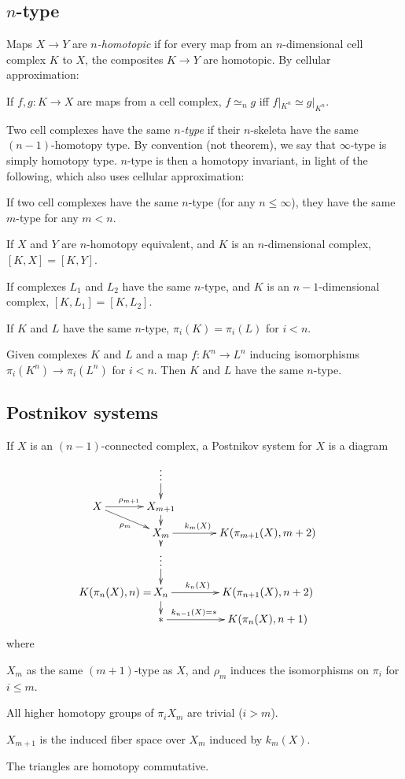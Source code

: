 \documentclass[11pt]{article}
\begin{document}
\subsection{\texorpdfstring{$n$}{n}-type}
Maps $X\to Y$ are \emph{$n$-homotopic} if for every map from an $n$-dimensional
cell complex $K$ to $X$, the composites $K\to Y$ are homotopic. By cellular
approximation:
\begin{prop*}
If $f,g:K\to X$ are maps from a cell complex, $f \simeq_n g$ iff 
$f|_{K^n}\simeq g|_{K^n}$.
\end{prop*}
Two cell complexes have the same \emph{$n$-type} if their $n$-skeleta have the
same $(n-1)$-homotopy type. By convention (not theorem), we say that
$\infty$-type is simply homotopy type. $n$-type is then a homotopy invariant, in
light of the following, which also uses cellular approximation:
\begin{prop*}
If two cell complexes have the same $n$-type (for any $n\leq\infty$), they have
the same $m$-type for any $m<n$.
\end{prop*}
\begin{lem*}
If $X$ and $Y$ are $n$-homotopy equivalent, and $K$ is an $n$-dimensional
complex, $[K,X]=[K,Y]$.
\end{lem*}
\begin{thm*}
If complexes $L_1$ and $L_2$ have the same $n$-type, and $K$ is an
$n-1$-dimensional complex, $[K,L_1]=[K,L_2]$.
\end{thm*}
\begin{cor*}
If $K$ and $L$ have the same $n$-type, $\pi_i(K)=\pi_i(L)$ for $i<n$.
\end{cor*}
\begin{thm*}[Whitehead]
Given complexes $K$ and $L$ and a map $f:K^n\to L^n$ inducing isomorphisms
$\pi_i(K^n)\to\pi_i(L^n)$ for $i<n$. Then $K$ and $L$ have the same $n$-type.
\end{thm*}

\subsection{Postnikov systems}
If $X$ is an $(n-1)$-connected complex, a Postnikov system for $X$ is a diagram
\[\xymatrix@C=1.2cm@R=.3cm{
&\vdots\ar[d]\\
X\ar[r]^{\rho_{m+1}}\ar[rd]_{\rho_m}&X_{m+1}\ar[d]\\
&X_m\ar[r]^{k_m(X)\ \ \ \ \ \ \ \ \ }\ar[d]&K(\pi_{m+1}(X),m+2)\\
&\vdots\ar[d]\\
&\makebox[0cm][r]{$K(\pi_n(X),n)=\,$}
X_n\ar[r]^{k_n(X)\ \ \ \ \ \ \ \ \ }\ar[d]&K(\pi_{n+1}(X),n+2)\\
&{*}\ar[r]^{k_{n-1}(X)=*\ \ \ \ \ \ \ \ \ \ \ }&K(\pi_{n}(X),n+1)
}\]
where
\begin{itemise}
\item $X_m$ as the same $(m+1)$-type as $X$, and $\rho_m$ induces the
isomorphisms on $\pi_i$ for $i\leq m$.
\item All higher homotopy groups of $\pi_iX_m$ are trivial ($i>m$).
\item $X_{m+1}$ is the induced fiber space over $X_m$ induced by $k_m(X)$.
\item The triangles are homotopy commutative.
\end{itemise}
\end{document}
